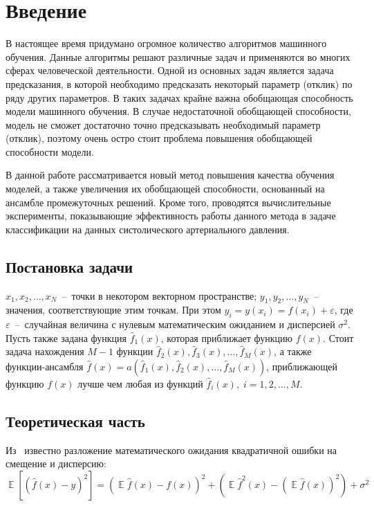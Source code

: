 \documentclass[12pt, fleqn]{article}
\newcommand{\expectation}{\mathop{\mathbb{E}}}
\newcommand{\predictionfunction}{\hat{f}}
\newcommand{\ensemblefunction}{a}
\newcommand{\numberobjects}{N}
\newcommand{\numberpredictionfunctions}{M}
\newcommand{\many}[3]{#1 1 #2, #1 2 #2, \dots, #1 #3 #2}  %
\newcommand{\ensemblefunctionfull}{\ensemblefunction(\many{\predictionfunction_}{(x)}{\numberpredictionfunctions})}
\begin{document}
\newpage
\section{Введение}

В настоящее время придумано огромное количество алгоритмов машинного обучения. Данные алгоритмы решают различные задач и применяются во многих сферах человеческой деятельности. Одной из основных задач является задача предсказания, в которой необходимо предсказать некоторый параметр (отклик) по ряду других параметров. В таких задачах крайне важна обобщающая способность модели машинного обучения. В случае недостаточной обобщающей способности, модель не сможет достаточно точно предсказывать необходимый параметр (отклик), поэтому очень остро стоит проблема повышения обобщающей способности модели.

В данной работе рассматривается новый метод повышения качества обучения моделей, а также увеличения их обобщающей способности, основанный на ансамбле промежуточных решений. Кроме того, проводятся вычислительные эксперименты, показывающие эффективность работы данного метода в задаче классификации на данных систолического артериального давления.

\subsection{Постановка задачи}

$\many{x_}{}{\numberobjects}$~--~точки в некотором векторном пространстве; $\many{y_}{}{\numberobjects}$~--~ значения, соответствующие этим точкам. При этом $y_i = y(x_i) = f(x_i) + \varepsilon$, где $\varepsilon$~--~случайная величина с нулевым математическим ожиданием и дисперсией $\sigma^2$. Пусть также задана функция $\predictionfunction_1(x)$, которая приближает функцию $f(x)$. Стоит задача нахождения $\numberpredictionfunctions - 1$ функции $\predictionfunction_2(x), \predictionfunction_3(x), \dots, \predictionfunction_\numberpredictionfunctions(x)$, а также функции-ансамбля $\predictionfunction(x) = \ensemblefunctionfull$, приближающей функцию $f(x)$ лучше чем любая из функций $\predictionfunction_i(x), \; i = \many{}{}{\numberpredictionfunctions}$.

\subsection{Теоретическая часть}
Из~\cite{BiasVarianceDecompositionZeroOneSquaredLoss} известно разложение математического ожидания квадратичной ошибки на смещение и дисперсию:
\begin{equation*}
\expectation \left[ \left( \predictionfunction(x) - y \right)^2 \right] =
\left(
	\expectation \predictionfunction(x) - f(x)
\right)^2  +
\left(
	\expectation \predictionfunction^2(x) - \left(\expectation \predictionfunction(x)\right)^2
\right) + \sigma^2
\end{equation*}
\end{document}
